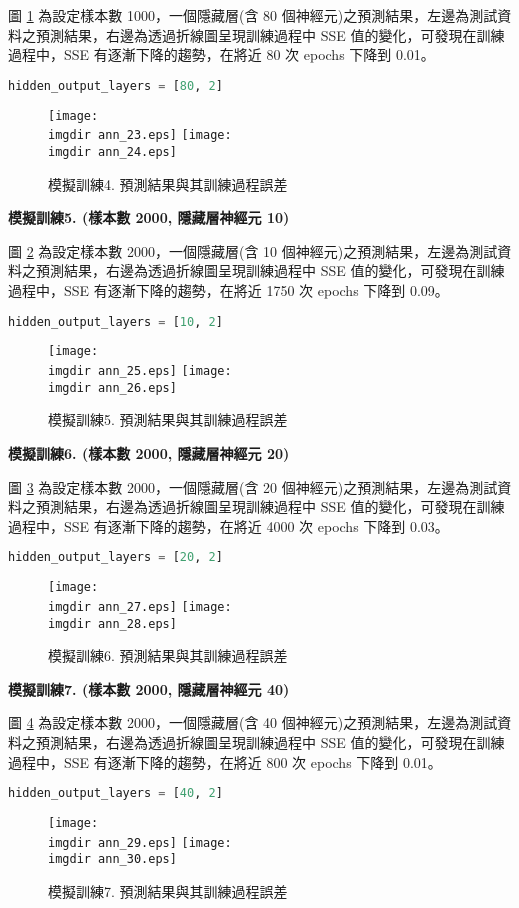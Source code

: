 圖 \ref{fig:ann_11} 為設定樣本數 1000，一個隱藏層(含 80 個神經元)之預測結果，左邊為測試資料之預測結果，右邊為透過折線圖呈現訓練過程中 SSE 值的變化，可發現在訓練過程中，SSE 有逐漸下降的趨勢，在將近 80 次 epochs 下降到 0.01。
\bigskip
\begin{lstlisting}[language = Python]
hidden_output_layers = [80, 2] 
\end{lstlisting}
\begin{figure}[H]
	\centering
	\texttt{[image: \\imgdir ann\_23.eps]}
	\texttt{[image: \\imgdir ann\_24.eps]}
	\caption{模擬訓練4. 預測結果與其訓練過程誤差}
	 \label{fig:ann_11}
\end{figure}

\textbf{\large 模擬訓練5. (樣本數 2000, 隱藏層神經元 10)}

圖 \ref{fig:ann_12} 為設定樣本數 2000，一個隱藏層(含 10 個神經元)之預測結果，左邊為測試資料之預測結果，右邊為透過折線圖呈現訓練過程中 SSE 值的變化，可發現在訓練過程中，SSE 有逐漸下降的趨勢，在將近 1750 次 epochs 下降到 0.09。
\bigskip
\begin{lstlisting}[language = Python]
hidden_output_layers = [10, 2] 
\end{lstlisting}
\begin{figure}[H]
	\centering
	\texttt{[image: \\imgdir ann\_25.eps]}
	\texttt{[image: \\imgdir ann\_26.eps]}
	\caption{模擬訓練5. 預測結果與其訓練過程誤差}
	 \label{fig:ann_12}
\end{figure}

\textbf{\large 模擬訓練6. (樣本數 2000, 隱藏層神經元 20)}

圖 \ref{fig:ann_13} 為設定樣本數 2000，一個隱藏層(含 20 個神經元)之預測結果，左邊為測試資料之預測結果，右邊為透過折線圖呈現訓練過程中 SSE 值的變化，可發現在訓練過程中，SSE 有逐漸下降的趨勢，在將近 4000 次 epochs 下降到 0.03。
\bigskip
\begin{lstlisting}[language = Python]
hidden_output_layers = [20, 2] 
\end{lstlisting}
\begin{figure}[H]
	\centering
	\texttt{[image: \\imgdir ann\_27.eps]}
	\texttt{[image: \\imgdir ann\_28.eps]}
	\caption{模擬訓練6. 預測結果與其訓練過程誤差}
	 \label{fig:ann_13}
\end{figure}

\textbf{\large 模擬訓練7. (樣本數 2000, 隱藏層神經元 40)}

圖 \ref{fig:ann_14} 為設定樣本數 2000，一個隱藏層(含 40 個神經元)之預測結果，左邊為測試資料之預測結果，右邊為透過折線圖呈現訓練過程中 SSE 值的變化，可發現在訓練過程中，SSE 有逐漸下降的趨勢，在將近 800 次 epochs 下降到 0.01。
\bigskip
\begin{lstlisting}[language = Python]
hidden_output_layers = [40, 2] 
\end{lstlisting}
\begin{figure}[H]
	\centering
	\texttt{[image: \\imgdir ann\_29.eps]}
	\texttt{[image: \\imgdir ann\_30.eps]}
	\caption{模擬訓練7. 預測結果與其訓練過程誤差}
	 \label{fig:ann_14}
\end{figure}

